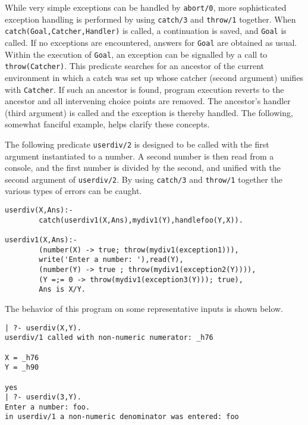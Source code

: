 \begin{description}
\vspace{-7mm}
While very simple exceptions can be handled by {\tt abort/0}, more
sophisticated exception handling is performed by using {\tt catch/3}
and {\tt throw/1} together.  When {\tt catch(Goal,Catcher,Handler)} is
called, a continuation is saved, and {\tt Goal} is called.  If no
exceptions are encountered, answers for {\tt Goal} are obtained as
usual.  Within the execution of {\tt Goal}, an exception can be
signalled by a call to {\tt throw(Catcher)}.  This predicate searches
for an ancestor of the current environment in which a catch was set up
whose catcher (second argument) unifies with {\tt Catcher}.  If such
an ancestor is found, program execution reverts to the ancestor and
all intervening choice points are removed.  The ancestor's handler
(third argument) is called and the exception is thereby handled.  The
following, somewhat fanciful example, helps clarify these concepts.

The following predicate {\tt userdiv/2} is designed to be called with
the first argument instantiated to a number.  A second number is then
read from a console, and the first number is divided by the second,
and unified with the second argument of {\tt userdiv/2}.  By using
{\tt catch/3} and {\tt throw/1} together the various types of errors
can be caught.

\begin{small}
\begin{verbatim}
userdiv(X,Ans):- 
        catch(userdiv1(X,Ans),mydiv1(Y),handlefoo(Y,X)).

userdiv1(X,Ans):- 
        (number(X) -> true; throw(mydiv1(exception1))),
        write('Enter a number: '),read(Y),
        (number(Y) -> true ; throw(mydiv1(exception2(Y)))),
        (Y =;= 0 -> throw(mydiv1(exception3(Y))); true),
        Ans is X/Y.
\end{verbatim}
\end{small}

The behavior of this program on some representative inputs is shown
below.

\begin{small}
\begin{verbatim}
| ?- userdiv(X,Y).
userdiv/1 called with non-numeric numerator: _h76

X = _h76
Y = _h90

yes
| ?- userdiv(3,Y).
Enter a number: foo.
in userdiv/1 a non-numeric denominator was entered: foo


\end{verbatim}
\end{small}
\end{description}
